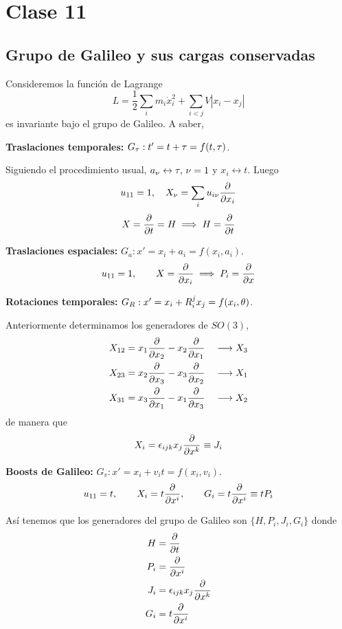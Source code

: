 \section{Clase 11}
\subsection{Grupo de Galileo y sus cargas conservadas}
Consideremos la función de Lagrange 
\begin{equation}
  L=\frac{1}{2}\sum_i m_i\dot{x}^2_i+\sum_{i<j}V|x_i-x_j|
\end{equation}
es invariante bajo el grupo de Galileo. A saber,

\textbf{Traslaciones temporales:} $G_\tau :t'=t+\tau =f(t,\tau )$. 

Siguiendo el procedimiento usual, $a_\nu \leftrightarrow \tau ,\, \nu =1$ y $x_i\leftrightarrow t$. Luego
\begin{equation}
  u_{11}=1,\quad X_\nu =\sum_i u_{i\nu }\pdv{x_i}
\end{equation}
\begin{equation}
  X=\pdv{t}=H\implies H=\pdv{t}
\end{equation}

\textbf{Traslaciones espaciales:} $G_a :x'=x_i+a_i=f(x_{i},a_{i})$.
\begin{equation}
  u_{11}=1,\qquad X=\pdv{x_i}\implies P_i=\pdv{x}
\end{equation}

\textbf{Rotaciones temporales:} $G_R :x'=x_i+R_{i}^j x_j=f(x_{i},\theta )$.

Anteriormente determinamos los generadores de $SO(3)$,
\begin{align}
  X_{12}&=x_1\pdv{x_2}-x_2\pdv{x_1} \quad \longrightarrow X_3\\
  X_{23}&=x_2\pdv{x_3}-x_3\pdv{x_2}\quad \longrightarrow X_1\\
  X_{31}&=x_3\pdv{x_1}-x_1\pdv{x_3}\quad \longrightarrow X_2
\end{align}
de manera que
\begin{equation}
  X_i=\epsilon_{ijk}x_j\pdv{x^k}\equiv J_i
\end{equation}

\textbf{Boosts de Galileo:} $G_v :x'=x_i+v_it=f(x_i,v_i)$.
\begin{equation}
  u_{11}=t,\qquad X_i=t\pdv{x^{i}},\qquad G_i=t\pdv{x^{i}}\equiv t P_i
\end{equation}

Así tenemos que los generadores del grupo de Galileo son $\{H,P_i,J_i,G_i\}$ donde
\begin{align}
  H&=\pdv{t}\\
  P_i&=\pdv{x^{i}}\\
  J_i&=\epsilon_{ijk}x_j\pdv{x^k}\\
  G_i&=t\pdv{x^{i}}
\end{align}

